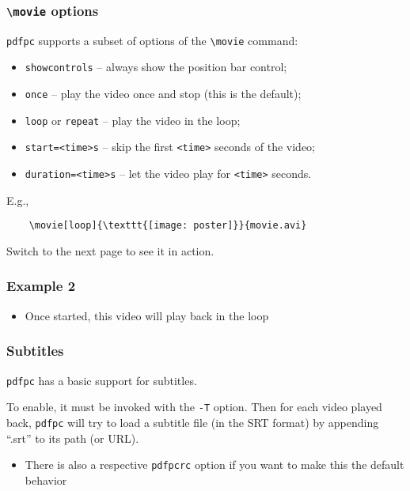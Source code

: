 \documentclass{beamer}
\newcommand{\singleitem}[1]{\begin{itemize}\item #1\end{itemize}}
\newcommand{\pdfpc}{\texttt{pdfpc}\xspace}
\newcommand{\opt}[1]{\texttt{#1}\xspace}
\begin{document}
\begin{frame}[fragile]
  \frametitle{\opt{\textbackslash movie} options}
  
  \pdfpc supports a subset of options of the \opt{\textbackslash movie} command:

  \begin{itemize}
    \item \opt{showcontrols} -- always show the position bar control;
    \item \opt{once} -- play the video once and stop (this is the default);
    \item \opt{loop} or \opt{repeat} -- play the video in the loop;
    \item \opt{start=<time>s} -- skip the first \opt{<time>} seconds of the
           video;
    \item \opt{duration=<time>s} -- let the video play for \opt{<time>} seconds.
  \end{itemize}
    
  \vspace{20pt}

  E.g., 
  \begin{lstlisting}
    \movie[loop]{\texttt{[image: poster]}}{movie.avi}
  \end{lstlisting}

  \vspace{10pt}
  Switch to the next page to see it in action.
\end{frame}

\begin{frame}
  \frametitle{Example 2}

  \vspace{10pt}
  \begin{center}
  \end{center}

  \singleitem{Once started, this video will play back in the loop}

\end{frame}

\begin{frame}
  \frametitle{Subtitles}

  \pdfpc has a basic support for subtitles. 
  
  \vspace{10pt}

  To enable, it must be invoked with the \opt{-T} option. Then for each video
  played back, \pdfpc will try to load a subtitle file (in the SRT format) by
  appending ``.srt'' to its path (or URL).
  
  \singleitem{There is also a respective \opt{pdfpcrc} option if you want to
    make this the default behavior}
\end{frame}
\end{document}
